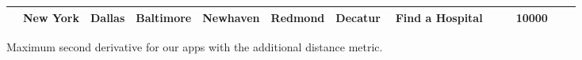 \begin{figure}
 \centering
 \begin{tabular}{|l||c|c|c|c|c|c|}
 \hline
 & New York & Dallas & Baltimore & Newhaven & Redmond & Decatur \
 \hline
 \hline
 Find a Hospital& & & 10000& & &  \\
\hline
\end{tabular}
 \caption{Maximum second derivative for our apps with the additional distance metric.}
 \label{fig:knee-points-{knees[0][3].split[0].downcase}}
\end{figure}
